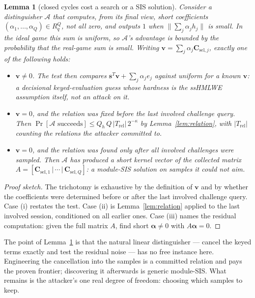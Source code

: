 \documentclass[11pt]{article}
\newcommand{\R}{R_q}
\newtheorem{lemma}[theorem]{Lemma}
\begin{document}
\begin{lemma}[closed cycles cost a search or a SIS solution]
\label{lem:lintest}
Consider a distinguisher $\mathcal A$ that computes, from its final view,
short coefficients $(\alpha_1,\ldots,\alpha_Q)\in\R^{Q}$, not all zero, and
outputs $1$ when $\bigl\|\sum_j\alpha_j h_j\bigr\|$ is small.  In the ideal
game this sum is uniform, so $\mathcal A$'s advantage is bounded by the
probability that the real-game sum is small.  Writing
$\mathbf v=\sum_j\alpha_j\mathbf C_{\mathrm{sel},j}$, exactly one of the
following holds:
\begin{itemize}
 \item[(i)] $\mathbf v\neq0$.  The test then compares
$\mathbf s^{T}\mathbf v+\sum_j\alpha_je_j$ against uniform for a known
$\mathbf v$: a decisional keyed-evaluation guess whose hardness is the
ssHMLWE assumption itself, not an attack on it.
 \item[(ii)] $\mathbf v=0$, and the relation was fixed before the last
involved challenge query.  Then
$\Pr[\mathcal A\text{ succeeds}]\le
Q_h\,Q\,|T_{\mathrm{rel}}|\,2^{-\kappa}$ by Lemma~\ref{lem:relation}, with
$|T_{\mathrm{rel}}|$ counting the relations the attacker committed to.
 \item[(iii)] $\mathbf v=0$, and the relation was found only after all
involved challenges were sampled.  Then $\mathcal A$ has produced a short
kernel vector of the collected matrix
$A=[\mathbf C_{\mathrm{sel},1}\,|\,\cdots\,|\,\mathbf C_{\mathrm{sel},Q}]$:
a module-SIS solution on samples it could not aim.
\end{itemize}
\end{lemma}

\begin{proof}[Proof sketch]
The trichotomy is exhaustive by the definition of $\mathbf v$ and by whether
the coefficients were determined before or after the last involved challenge
query.  Case (i) restates the test.  Case (ii) is Lemma~\ref{lem:relation}
applied to the last involved session, conditioned on all earlier ones.
Case (iii) names the residual computation: given the full matrix $A$, find
short $\boldsymbol\alpha\neq0$ with $A\boldsymbol\alpha=0$.
\end{proof}

The point of Lemma~\ref{lem:lintest} is that the natural linear
distinguisher --- cancel the keyed terms exactly and test the residual
noise --- has no free instance here.  Engineering the cancellation into the
samples is a committed relation and pays the proven frontier; discovering it
afterwards is generic module-SIS.  What remains is the attacker's one real
degree of freedom: choosing which samples to keep.
\end{document}
